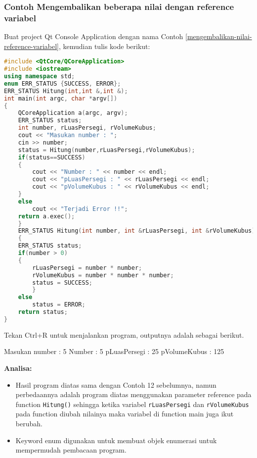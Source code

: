 \subsubsection*{Contoh  Mengembalikan beberapa nilai dengan reference variabel}

Buat project Qt Console Application dengan nama Contoh \ref{mengembalikan-nilai-reference-variabel}, kemudian
tulis kode berikut:

\begin{lstlisting}[language=c++, caption=Mengembalikan beberapa nilai dengan reference variabel, label=mengembalikan-nilai-reference-variabel]
#include <QtCore/QCoreApplication>
#include <iostream>
using namespace std;
enum ERR_STATUS {SUCCESS, ERROR};
ERR_STATUS Hitung(int,int &,int &);
int main(int argc, char *argv[])
{
    QCoreApplication a(argc, argv);
    ERR_STATUS status;
    int number, rLuasPersegi, rVolumeKubus;
    cout << "Masukan number : ";
    cin >> number;
    status = Hitung(number,rLuasPersegi,rVolumeKubus);
    if(status==SUCCESS)
    {
        cout << "Number : " << number << endl;
        cout << "pLuasPersegi : " << rLuasPersegi << endl;
        cout << "pVolumeKubus : " << rVolumeKubus << endl;
    }
    else
        cout << "Terjadi Error !!";
    return a.exec();
    }
    ERR_STATUS Hitung(int number, int &rLuasPersegi, int &rVolumeKubus)
    {
    ERR_STATUS status;
    if(number > 0)
    {
        rLuasPersegi = number * number;
        rVolumeKubus = number * number * number;
        status = SUCCESS;
        }
    else
        status = ERROR;
    return status;
}
\end{lstlisting}

Tekan Ctrl+R untuk menjalankan program, outputnya adalah sebagai
berikut.

\begin{lcverbatim}
Masukan number : 5
Number : 5
pLuasPersegi : 25
pVolumeKubus : 125
\end{lcverbatim}

\textbf{Analisa:}

\begin{itemize}
\tightlist
\item
  Hasil program diatas sama dengan Contoh 12 sebelumnya, namun
  perbedaannya adalah program diatas menggunakan parameter reference
  pada function \texttt{Hitung()} sehingga ketika variabel
  \texttt{rLuasPersegi} dan \texttt{rVolumeKubus} pada function diubah
  nilainya maka variabel di function main juga ikut berubah.
\item
  Keyword enum digunakan untuk membuat objek enumerasi untuk mempermudah
  pembacaan program.
\end{itemize}

